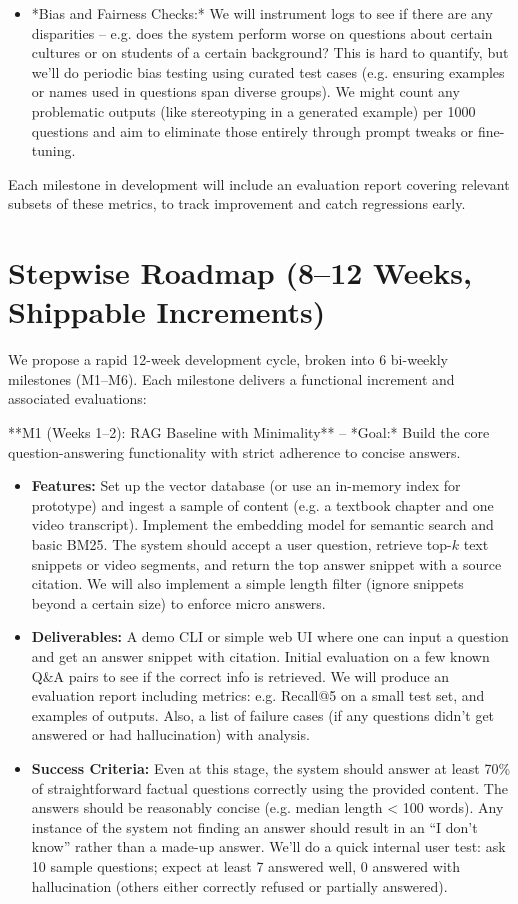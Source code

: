\documentclass[11pt]{article}
\begin{document}
\begin{itemize}
\begin{itemize}
      \item *Bias and Fairness Checks:* We will instrument logs to see if there are any disparities – e.g. does the system perform worse on questions about certain cultures or on students of a certain background? This is hard to quantify, but we’ll do periodic bias testing using curated test cases (e.g. ensuring examples or names used in questions span diverse groups). We might count any problematic outputs (like stereotyping in a generated example) per 1000 questions and aim to eliminate those entirely through prompt tweaks or fine-tuning.
    \end{itemize}
\end{itemize}
Each milestone in development will include an evaluation report covering relevant subsets of these metrics, to track improvement and catch regressions early.

\section{Stepwise Roadmap (8–12 Weeks, Shippable Increments)}
We propose a rapid 12-week development cycle, broken into 6 bi-weekly milestones (M1–M6). Each milestone delivers a functional increment and associated evaluations:

**M1 (Weeks 1–2): RAG Baseline with Minimality** – *Goal:* Build the core question-answering functionality with strict adherence to concise answers.
  \begin{itemize}
    \item \textbf{Features:} Set up the vector database (or use an in-memory index for prototype) and ingest a sample of content (e.g. a textbook chapter and one video transcript). Implement the embedding model for semantic search and basic BM25. The system should accept a user question, retrieve top-$k$ text snippets or video segments, and return the top answer snippet with a source citation. We will also implement a simple length filter (ignore snippets beyond a certain size) to enforce micro answers.
    \item \textbf{Deliverables:} A demo CLI or simple web UI where one can input a question and get an answer snippet with citation. Initial evaluation on a few known Q\&A pairs to see if the correct info is retrieved. We will produce an evaluation report including metrics: e.g. Recall@5 on a small test set, and examples of outputs. Also, a list of failure cases (if any questions didn’t get answered or had hallucination) with analysis.
    \item \textbf{Success Criteria:} Even at this stage, the system should answer at least 70\% of straightforward factual questions correctly using the provided content. The answers should be reasonably concise (e.g. median length < 100 words). Any instance of the system not finding an answer should result in an “I don’t know” rather than a made-up answer. We’ll do a quick internal user test: ask 10 sample questions; expect at least 7 answered well, 0 answered with hallucination (others either correctly refused or partially answered).
  \end{itemize}
\end{document}
